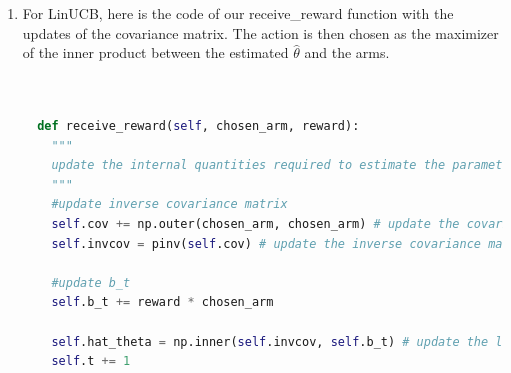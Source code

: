 \begin{enumerate}
    \item For LinUCB, here is the code of our receive\_reward function with the updates of the covariance matrix. The action is then chosen as the maximizer of the inner product between the estimated $\hat{\theta}$ and the arms.

    \begin{lstlisting}[language=Python]

        
  def receive_reward(self, chosen_arm, reward):
    """
    update the internal quantities required to estimate the parameter theta using least squares
    """
    #update inverse covariance matrix
    self.cov += np.outer(chosen_arm, chosen_arm) # update the covariance matrix
    self.invcov = pinv(self.cov) # update the inverse covariance matrix

    #update b_t
    self.b_t += reward * chosen_arm

    self.hat_theta = np.inner(self.invcov, self.b_t) # update the least square estimate
    self.t += 1
    \end{lstlisting}



\end{enumerate}
